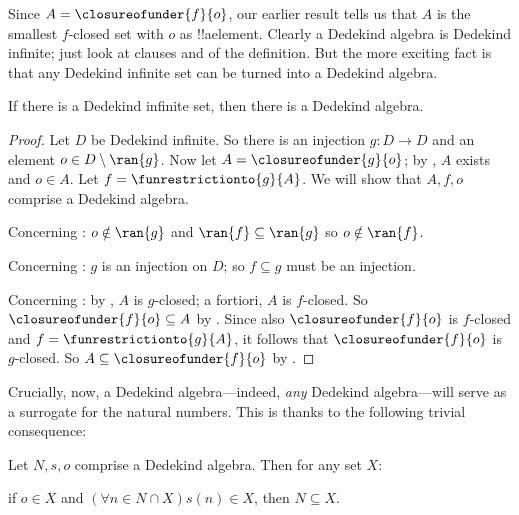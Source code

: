 Since $A = \closureofunder{f}{o}$, our earlier result tells us that
$A$ is the smallest $f$-closed set with $o$ as !!a{element}. Clearly a
Dedekind algebra is Dedekind infinite; just look at clauses
 and  of the definition. But
the more exciting fact is that any Dedekind infinite set can be turned
into a Dedekind algebra. 

\begin{thm}
If there is a Dedekind infinite set, then there is a Dedekind algebra.
\end{thm}

\begin{proof}
Let $D$ be Dedekind infinite. So there is an injection $g \colon D \to
D$ and an element $o  \in D \setminus \ran{g}$. Now let $A =
\closureofunder{g}{o}$; by , $A$ exists and $o \in A$. Let $f =
\funrestrictionto{g}{A}$. We will show that $A, f, o$ comprise a Dedekind
algebra. 

Concerning : $o \notin \ran{g}$ and $\ran{f}
\subseteq \ran{g}$ so $o\notin \ran{f}$.

Concerning : $g$ is an injection on $D$; so $f
\subseteq g$ must be an injection.

Concerning : by , $A$ is $g$-closed; a fortiori, $A$ is $f$-closed. So $\closureofunder{f}{o} \subseteq A$ by . Since also $\closureofunder{f}{o}$ is $f$-closed and $f = \funrestrictionto{g}{A}$, it follows that $\closureofunder{f}{o}$ is $g$-closed. So $A \subseteq \closureofunder{f}{o}$ by .
\end{proof}





Crucially, now, a Dedekind algebra---indeed, \emph{any} Dedekind
algebra---will serve as a surrogate for the natural numbers. This is
thanks to the following trivial consequence:

\begin{thm}
Let $N, s, o$ comprise a Dedekind algebra. Then for any set $X$:  
	\begin{center}
		if $o \in X$ and $(\forall {n} \in N \cap X){s}({n}) \in X$, {then} $N \subseteq X$.
	\end{center}
\end{thm}

